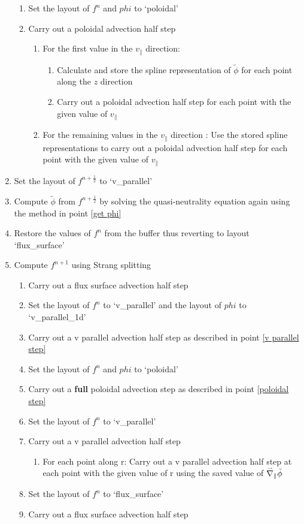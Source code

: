\begin{enumerate}
\begin{enumerate}
  \item Set the layout of $f^n$ and $phi$ to `poloidal'
  \item Carry out a poloidal advection half step \label{poloidal step}
  \begin{enumerate}
   \item For the first value in the $v_\parallel$ direction:
   \begin{enumerate}
    \item Calculate and store the spline representation of $\tilde{\phi}$ for each point along the $z$ direction
    \item Carry out a poloidal advection half step for each point with the given value of $v_\parallel$
   \end{enumerate}
   \item For the remaining values in the $v_\parallel$ direction : Use the stored spline representations to carry out a poloidal advection half step for each point with the given value of $v_\parallel$
  \end{enumerate}
 \end{enumerate}
 \item Set the layout of $f^{n+\frac{1}{2}}$ to `v\_parallel'
 \item Compute $\tilde{\phi}$ from $f^{n+\frac{1}{2}}$ by solving the quasi-neutrality equation again using the method in point \ref{get phi}
 \item Restore the values of $f^{n}$ from the buffer thus reverting to layout `flux\_surface'
 \item Compute $f^{n+1}$ using Strang splitting
 \begin{enumerate}
  \item Carry out a flux surface advection half step
  \item Set the layout of $f^n$ to `v\_parallel' and the layout of $phi$ to `v\_parallel\_1d'
  \item Carry out a v parallel advection half step as described in point \ref{v parallel step}
  \item Set the layout of $f^n$ and $phi$ to `poloidal'
  \item Carry out a {\bf full} poloidal advection step as described in point \ref{poloidal step}
  \item Set the layout of $f^n$ to `v\_parallel'
  \item Carry out a v parallel advection half step
  \begin{enumerate}
    \item For each point along r:  Carry out a v parallel advection half step at each point with the given value of r using the saved value of $\accentset{\rightharpoonup}{\nabla}_\parallel \tilde{\phi}$
  \end{enumerate}
  \item Set the layout of $f^n$ to `flux\_surface'
  \item Carry out a flux surface advection half step
 \end{enumerate}
\end{enumerate}

